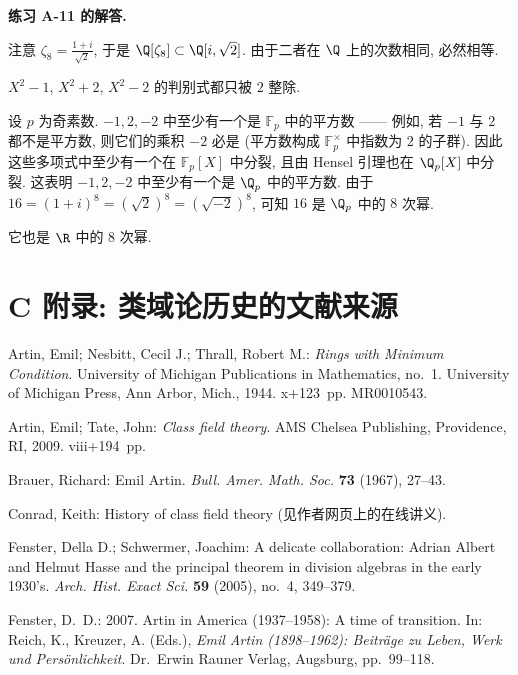 \noindent\textbf{练习 A-11 的解答.}

注意 $\zeta_8=\frac{1+i}{\sqrt{2}}$, 于是 $\Q[\zeta_8]\subset\Q[i,\sqrt{2}]$. 由于二者在 $\Q$ 上的次数相同, 必然相等.

$X^{2}-1$, $X^{2}+2$, $X^{2}-2$ 的判别式都只被 $2$ 整除.

设 $p$ 为奇素数. $-1,2,-2$ 中至少有一个是 $\mathbb{F}_p$ 中的平方数 —— 例如, 若 $-1$ 与 $2$ 都不是平方数, 则它们的乘积 $-2$ 必是 (平方数构成 $\mathbb{F}_p^{\times}$ 中指数为 $2$ 的子群). 因此这些多项式中至少有一个在 $\mathbb{F}_p[X]$ 中分裂, 且由 Hensel 引理也在 $\Q_p[X]$ 中分裂. 这表明 $-1,2,-2$ 中至少有一个是 $\Q_p$ 中的平方数. 由于 $16=(1+i)^{8}=(\sqrt{2})^{8}=(\sqrt{-2})^{8}$, 可知 $16$ 是 $\Q_p$ 中的 $8$ 次幂.

它也是 $\R$ 中的 $8$ 次幂.

\cleardoublepage{}
\section*{C 附录: 类域论历史的文献来源}\label{sec:VIII.C}

\medskip\noindent Artin, Emil; Nesbitt, Cecil J.; Thrall, Robert M.: \emph{Rings with Minimum Condition}. University of Michigan Publications in Mathematics, no.~1. University of Michigan Press, Ann Arbor, Mich., 1944. x+123~pp. MR0010543.\par\medskip

\noindent Artin, Emil; Tate, John: \emph{Class field theory}. AMS Chelsea Publishing, Providence, RI, 2009. viii+194~pp.\par\medskip

\noindent Brauer, Richard: Emil Artin. \emph{Bull. Amer. Math. Soc.} \textbf{73} (1967), 27--43.\par\medskip

\noindent Conrad, Keith: History of class field theory (见作者网页上的在线讲义).\par\medskip

\noindent Fenster, Della D.; Schwermer, Joachim: A delicate collaboration: Adrian Albert and Helmut Hasse and the principal theorem in division algebras in the early 1930's. \emph{Arch. Hist. Exact Sci.} \textbf{59} (2005), no.~4, 349--379.\par\medskip

\noindent Fenster, D.~D.: 2007. Artin in America (1937--1958): A time of transition. In: Reich, K., Kreuzer, A. (Eds.), \emph{Emil Artin (1898--1962): Beitr\"age zu Leben, Werk und Pers\"onlichkeit}. Dr.~Erwin Rauner Verlag, Augsburg, pp.~99--118.\par\medskip

